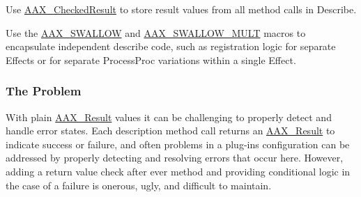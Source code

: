 \begin{DoxyItemize}
\item Use \mbox{\hyperlink{a01601}{A\+A\+X\+\_\+\+Checked\+Result}} to store result values from all method calls in Describe.
\item Use the \mbox{\hyperlink{a00497_a8f177823e9388c5163d1b402a9069bce}{A\+A\+X\+\_\+\+S\+W\+A\+L\+L\+OW}} and \mbox{\hyperlink{a00497_aef6db72a3774d079609f94720928cdd6}{A\+A\+X\+\_\+\+S\+W\+A\+L\+L\+O\+W\+\_\+\+M\+U\+LT}} macros to encapsulate independent describe code, such as registration logic for separate Effects or for separate Process\+Proc variations within a single Effect.
\end{DoxyItemize}

\hypertarget{a00796_describe_checking_results_problem}{}\subsubsection{The Problem}\label{a00796_describe_checking_results_problem}
 With plain \mbox{\hyperlink{a00392_a4d8f69a697df7f70c3a8e9b8ee130d2f}{A\+A\+X\+\_\+\+Result}} values it can be challenging to properly detect and handle error states. Each description method call returns an \mbox{\hyperlink{a00392_a4d8f69a697df7f70c3a8e9b8ee130d2f}{A\+A\+X\+\_\+\+Result}} to indicate success or failure, and often problems in a plug-\/in\textquotesingle{}s configuration can be addressed by properly detecting and resolving errors that occur here. However, adding a return value check after ever method and providing conditional logic in the case of a failure is onerous, ugly, and difficult to maintain.


\begin{DoxyCode}{0}
\DoxyCodeLine{}
\end{DoxyCode}



\begin{DoxyCode}{0}
\DoxyCodeLine{\textcolor{comment}{// --------------------------------------------------}}
\DoxyCodeLine{\textcolor{comment}{// Safer, but not a good solution:}}
\DoxyCodeLine{\textcolor{comment}{// Information about the errors is lost, the}}
\DoxyCodeLine{\textcolor{comment}{// merged error code is meaningless, and}}
\DoxyCodeLine{\textcolor{comment}{// debugging to find the location of the}}
\DoxyCodeLine{\textcolor{comment}{// failure is hard.}}
\DoxyCodeLine{\textcolor{comment}{//}}
\DoxyCodeLine{\textcolor{comment}{// ...}}
\DoxyCodeLine{\{}
\DoxyCodeLine{  \textcolor{comment}{// handle the merged error code}}
\DoxyCodeLine{\}}
\end{DoxyCode}



